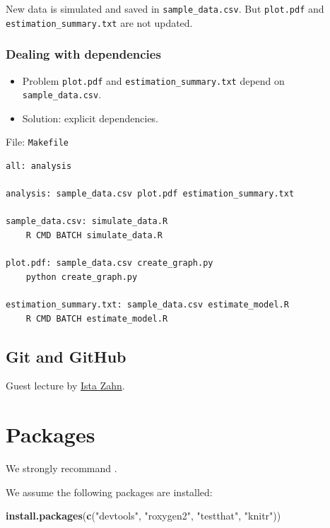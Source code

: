 \documentclass[]{book}
\newenvironment{Shaded}{\begin{snugshade}}{\end{snugshade}}
\newcommand{\KeywordTok}[1]{\textcolor[rgb]{0.13,0.29,0.53}{\textbf{#1}}}
\newcommand{\StringTok}[1]{\textcolor[rgb]{0.31,0.60,0.02}{#1}}
\newcommand{\NormalTok}[1]{#1}
\providecommand{\tightlist}{%
  \setlength{\itemsep}{0pt}\setlength{\parskip}{0pt}}
\theoremstyle{definition}
\theoremstyle{definition}
\theoremstyle{definition}
\theoremstyle{remark}
\begin{document}
New data is simulated and saved in \texttt{sample\_data.csv}. But
\texttt{plot.pdf} and \texttt{estimation\_summary.txt} are not updated.

\subsection{Dealing with dependencies}\label{dealing-with-dependencies}

\begin{itemize}
\tightlist
\item
  Problem \texttt{plot.pdf} and \texttt{estimation\_summary.txt} depend
  on \texttt{sample\_data.csv}.
\item
  Solution: explicit dependencies.
\end{itemize}

File: \texttt{Makefile}

\begin{verbatim}
all: analysis

analysis: sample_data.csv plot.pdf estimation_summary.txt

sample_data.csv: simulate_data.R
    R CMD BATCH simulate_data.R

plot.pdf: sample_data.csv create_graph.py
    python create_graph.py

estimation_summary.txt: sample_data.csv estimate_model.R
    R CMD BATCH estimate_model.R
\end{verbatim}

\section{Git and GitHub}\label{git-and-github}

Guest lecture by \href{https://www.iq.harvard.edu/people/ista-zahn}{Ista
Zahn}.

\chapter{Packages}\label{packages}

We strongly recommand \citet{Wickham2015}.

We assume the following packages are installed:

\begin{Shaded}
\begin{Highlighting}[]
\KeywordTok{install.packages}\NormalTok{(}\KeywordTok{c}\NormalTok{(}\StringTok{"devtools"}\NormalTok{, }\StringTok{"roxygen2"}\NormalTok{, }\StringTok{"testthat"}\NormalTok{, }\StringTok{"knitr"}\NormalTok{))}
\end{Highlighting}
\end{Shaded}
\end{document}
